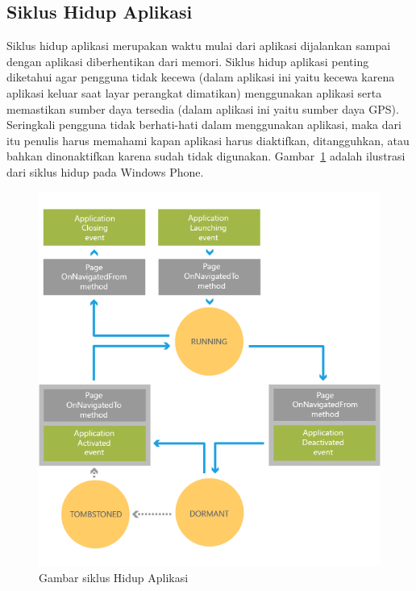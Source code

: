 \subsection{Siklus Hidup Aplikasi}
\label{subsec:Siklus Hidup Aplikasi}
\hspace{0.5cm} Siklus hidup aplikasi merupakan waktu mulai dari aplikasi dijalankan sampai dengan aplikasi diberhentikan dari memori. Siklus hidup aplikasi penting diketahui agar pengguna tidak kecewa (dalam aplikasi ini yaitu kecewa karena aplikasi keluar saat layar perangkat dimatikan) menggunakan aplikasi serta memastikan sumber daya tersedia (dalam aplikasi ini yaitu sumber daya GPS). Seringkali pengguna tidak berhati-hati dalam menggunakan aplikasi, maka dari itu penulis harus memahami kapan aplikasi harus diaktifkan, ditangguhkan, atau bahkan dinonaktifkan karena sudah tidak digunakan. Gambar~\ref{fig:Siklus Hidup Aplikasi} adalah ilustrasi dari siklus hidup pada Windows Phone.

\begin{figure}[h]
	\centering
		\includegraphics[scale=0.4]{Gambar/lifecycle_wp8}
	\caption{Gambar siklus Hidup Aplikasi\cite{MSDN}}
	\label{fig:Siklus Hidup Aplikasi}
\end{figure}

